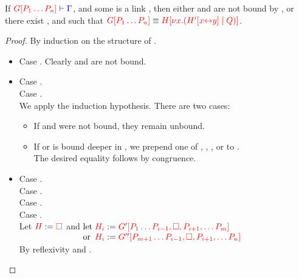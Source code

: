 \begin{lemmaB}\label{thm:cp-progress-link}
  If $\seq[{ \cpPlug{G}{P_1 \dots P_n} }]{ \Gamma }$, and some  is a
  link , then either  and  are not bound by
  , or there exist ,  and  such that
  $\tm{\cpPlug{G}{P_1 \dots P_n}} \equiv
  \tm{\cpPlug{H}{\cpCut{x}{\cpPlug{H'}{\cpLink{x}{y}}}{Q}}}$. 
\end{lemmaB}
\begin{proof}
  By induction on the structure of .
  \begin{itemize}
  \item
    Case \tm{\Box}. Clearly  and  are not bound.
  \item
    Case .\\
    Case .\\
    We apply the induction hypothesis. There are two cases:
    \begin{itemize}
    \item
      If  and  were not bound, they remain unbound.
    \item
      If  or  is bound deeper in , we prepend one of
      ,
      ,
      , or
       to .
      \\
      The desired equality follows by congruence.
    \end{itemize}
  \item
    Case .\\
    Case .\\
    Case .\\
    Case .
    \\
    Let $\tm{H} := \tm{\Box}$ and 
    \(\arraycolsep=0pt\begin{array}[t]{ll}
      \text{let}
      & \; \tm{H_i} := \tm{\cpPlug{G'}{P_1 \dots P_{i-1}, \Box, P_{i+1}, \dots P_m}}
      \\
      \text{or}
      & \; \tm{H_i} := \tm{\cpPlug{G''}{P_{m+1} \dots P_{i-1}, \Box, P_{i+1}, \dots P_n}}
    \end{array}\)
    \\[1ex]
    By reflexivity and \cpEquivCutComm.
  \end{itemize}
\end{proof}
